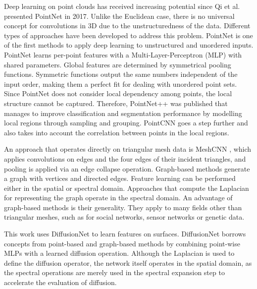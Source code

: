\documentclass[class=article, crop=false]{standalone}
\begin{document}
Deep learning on point clouds has received increasing potential since Qi et al. presented PointNet \cite{Qi2017} in 2017. %
Unlike the Euclidean case, there is no universal concept for convolutions in 3D due to the unstructuredness of the data. Different types of approaches have been developed to address this problem.
PointNet is one of the first methods to apply deep learning to unstructured and unordered inputs. PointNet learns per-point features with a Multi-Layer-Perceptron (MLP) with shared parameters. Global features are determined by symmetrical pooling functions. Symmetric functions output the same numbers independent of the input order, making them a perfect fit for dealing with unordered point sets.
Since PointNet does not consider local dependency among points, the local structure cannot be captured. Therefore, PointNet++ \cite{Qi2017b} was published that manages to improve classification and segmentation performance by modelling local regions through sampling and grouping. PointCNN \cite{Li2018} goes a step further and also takes into account the correlation between points in the local regions.

An approach that operates directly on triangular mesh data is MeshCNN \cite{Hanocka2019}, which applies convolutions on edges and the four edges of their incident triangles, and pooling is applied via an edge collapse operation.
Graph-based methods generate a graph with vertices and directed edges. Feature learning can be performed either in the spatial or spectral domain. Approaches that compute the Laplacian for representing the graph operate in the spectral domain. An advantage of graph-based methods is their generality. They apply to many fields other than triangular meshes, such as for social networks, sensor networks or genetic data.

This work uses DiffusionNet \cite{sharp2022diffusion} to learn features on surfaces. DiffusionNet borrows concepts from point-based and graph-based methods by combining point-wise MLPs with a learned diffusion operation. Although the Laplacian is used to define the diffusion operator, the network itself operates in the spatial domain, as the spectral operations are merely used in the spectral expansion step to accelerate the evaluation of diffusion.



\end{document}
